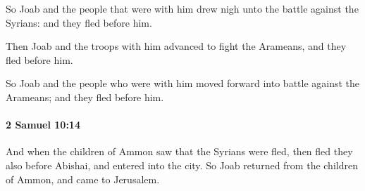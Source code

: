 			\begin{versebox}
					\item[BHS] 
					\item[ASV] So Joab and the people that were with him drew nigh unto the battle against the Syrians: and they fled before him.
					\item[NIV] Then Joab and the troops with him advanced to fight the Arameans, and they fled before him.
					\item[NRSV] So Joab and the people who were with him moved forward into battle against the Arameans; and they fled before him.
			\end{versebox}

		\paragraph{2 Samuel 10:14} %
			\label{2SAMUEL-10-14}

			And when the children of Ammon saw that the Syrians were fled, then fled they also before Abishai, and entered into the city. So Joab returned from the children of Ammon, and came to Jerusalem.

